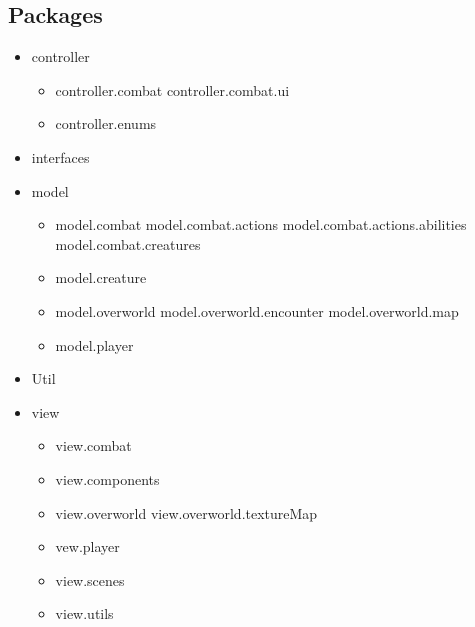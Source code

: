 \subsection{Packages}
\begin{itemize}
	\item controller
	      \begin{itemize}
		      \item controller.combat
		            \subitem controller.combat.ui
		      \item controller.enums
	      \end{itemize}
	\item interfaces
	\item model
	      \begin{itemize}
		      \item model.combat
		            \subitem model.combat.actions
		            \subitem model.combat.actions.abilities
		            \subitem model.combat.creatures
		      \item model.creature
		      \item model.overworld
		            \subitem model.overworld.encounter
		            \subitem model.overworld.map
		      \item model.player
	      \end{itemize}
	\item Util
	\item view
	      \begin{itemize}
		      \item view.combat
		      \item view.components
		      \item view.overworld
		            \subitem view.overworld.textureMap
		      \item vew.player
		      \item view.scenes
		      \item view.utils
	      \end{itemize}
\end{itemize}

